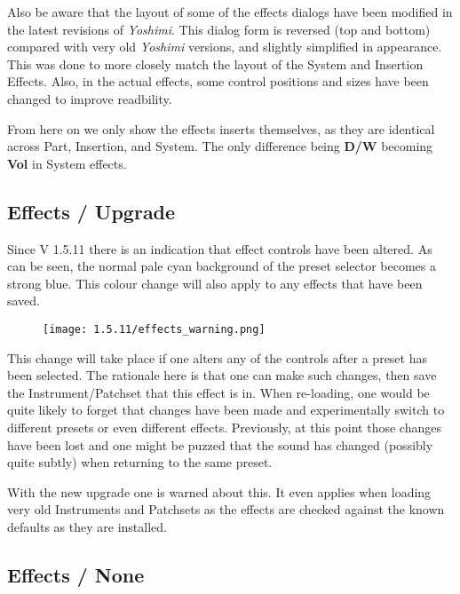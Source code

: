    Also be aware that the layout of some of the effects dialogs have been modified
   in the latest revisions of \textsl{Yoshimi}.
   This dialog form is reversed (top and bottom) compared with very old
   \textsl{Yoshimi} versions, and slightly simplified in appearance. This was done to
   more closely match the layout of the System and Insertion Effects.
   Also, in the actual effects, some control positions and sizes have been changed
   to improve readbility.

   From here on we only show the effects inserts themselves, as they are identical
   across Part, Insertion, and System. The only difference being \textbf{D/W} becoming
   \textbf{Vol} in System effects.

\subsection{Effects / Upgrade}
\label{subsec:effects_upgrade}
   Since V 1.5.11 there is an indication that effect controls have been altered. As can
   be seen, the normal pale cyan background of the preset selector becomes a strong blue.
   This colour change will also apply to any effects that have been saved.
   \begin{figure}[H]
   \centering
   \texttt{[image: 1.5.11/effects\_warning.png]}
   \label{fig:effects_warning}
\end{figure}

   This change will take place if one alters any of the controls after a preset has been
   selected. The rationale here is that one can make such changes, then save the
   Instrument/Patchset that this effect is in.
   When re-loading, one would be quite likely to forget that changes have been made and
   experimentally switch to different presets or even different effects.
   Previously, at this point those changes have been lost and one might be puzzed that
   the sound has changed (possibly quite subtly) when returning to the same preset.

   With the new upgrade one is warned about this. It even applies when loading very old
   Instruments and Patchsets as the effects are checked against the known defaults as
   they are installed.

\subsection{Effects / None}
\label{subsec:effects_edit_none}

